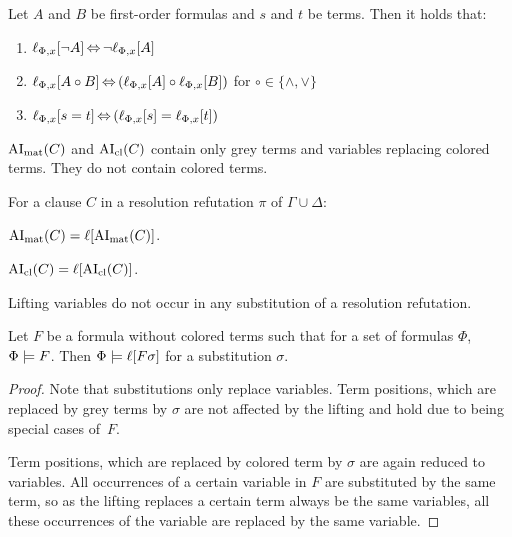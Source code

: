 \documentclass[,%
	paper=a4,%
	DIV12, %
	twoside=false,%
	liststotoc,
	bibtotoc,
	draft=false,%
	numbers=noendperiod
]{scrartcl}
\begin{document}
\begin{lemma}
	\label{lemma:lift_logic_commute}
	Let $A$ and $B$ be first-order formulas and $s$ and $t$ be terms. Then it holds that:
	\begin{enumerate}
		\item $\lift{\Phi}{\lnot A}{x} \semiff{} \lnot \lift{\Phi}{A}{x}$
		\item $\lift{\Phi}{A \circ B}{x} \semiff{} ( \lift{\Phi}{A}{x} \circ \lift{\Phi}{B}{x} )$ for  $\circ \in     \{\land, \lor\}$
		\item $\lift{\Phi}{s = t}{x} \semiff{} ( \lift{\Phi}{s}{x} = \lift{\Phi}{t}{x} )$
	\end{enumerate}
\end{lemma}



\begin{lemma}
	\label{lemma:no_colored_terms}
	$\AImatrix(C)$ and $\AIclause(C)$ contain only grey terms and variables replacing colored terms. They do not contain colored terms.
\end{lemma}



\begin{corr}
	\label{corr:lift_ai}
	For a clause $C$ in a resolution refutation $\pi$ of $\Gamma \cup \Delta$:
	\begin{compactenum}
	\item $\AImatrix(C) = \lifboth{\AImatrix(C)}$.

	\item $\AIclause(C) = \lifboth{\AIclause(C)}$.
	\end{compactenum}
\end{corr}

\begin{lemma}
	\label{lemma:no_lifting_vars_in_subst}
	Lifting variables do not occur in any substitution of a resolution refutation.
\end{lemma}

\begin{lemma}
	\label{lemma:substitute_and_lift}
	Let $F$ be a formula without colored terms such that for a set of formulas $\Phi$, $\Phi \entails F$.
	Then $\Phi \entails \lifboth{F\sigma}$ for a substitution $\sigma$.
\end{lemma}
\begin{proof}
	Note that substitutions only replace variables. Term positions, which are replaced by grey terms by $\sigma$ are not affected by the lifting and hold due to being special cases of~$F$.

	Term positions, which are replaced by colored term by $\sigma$ are again reduced to variables.
	All occurrences of a certain variable in $F$ are substituted by the same term, so as the lifting replaces a certain term always be the same variables, all these occurrences of the variable are replaced by the same variable.
\end{proof}
\end{document}
